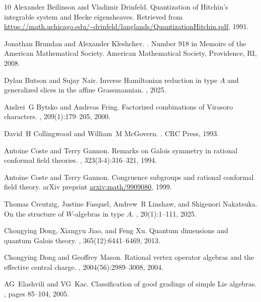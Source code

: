 \documentclass[12pt]{amsart}
\theoremstyle{plain}
\theoremstyle{definition}
\numberwithin{equation}{section}
\begin{document}
\begin{thebibliography}{10}
Alexander Beilinson and Vladimir Drinfeld.
\newblock Quantization of {H}itchin's integrable system and {H}ecke
  eigensheaves.
\newblock Retrieved from
  \url{https://math.uchicago.edu/~drinfeld/langlands/QuantizationHitchin.pdf},
  1991.

Jonathan Brundan and Alexander Kleshchev.
.
\newblock Number 918 in Memoirs of the American Mathematical Society. American
  Mathematical Society, Providence, RI, 2008.

Dylan Butson and Sujay Nair.
\newblock Inverse {H}amiltonian reduction in type {$A$} and generalized slices
  in the affine {G}rassmannian.
, 2025.

Andrei~G Bytsko and Andreas Fring.
\newblock Factorized combinations of {V}irasoro characters.
, 209(1):179--205, 2000.

David~H Collingwood and William~M McGovern.
.
\newblock CRC Press, 1993.

Antoine Coste and Terry Gannon.
\newblock Remarks on {G}alois symmetry in rational conformal field theories.
, 323(3-4):316--321, 1994.

Antoine Coste and Terry Gannon.
\newblock Congruence subgroups and rational conformal field theory.
\newblock arXiv preprint \url{arxiv:math/9909080}, 1999.

Thomas Creutzig, Justine Fasquel, Andrew~R Linshaw, and Shigenori Nakatsuka.
\newblock On the structure of {$W$}-algebras in type {$A$}.
, 20(1):1--111, 2025.

Chongying Dong, Xiangyu Jiao, and Feng Xu.
\newblock Quantum dimensions and quantum {G}alois theory.
,
  365(12):6441--6469, 2013.

Chongying Dong and Geoffrey Mason.
\newblock Rational vertex operator algebras and the effective central charge.
,
  2004(56):2989--3008, 2004.

AG~Elashvili and VG~Kac.
\newblock Classification of good gradings of simple {L}ie algebras.
, pages
  85--104, 2005.


\end{thebibliography}
\end{document}
